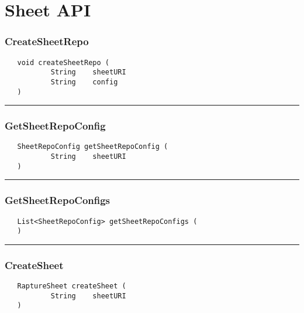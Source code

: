 \chapter{Sheet API}

\subsection{CreateSheetRepo}
\label{Api:CreateSheetRepo}
\begin{verbatim}
   void createSheetRepo (
           String    sheetURI
           String    config
   )
\end{verbatim}



\rule{15cm}{2pt}
\subsection{GetSheetRepoConfig}
\label{Api:GetSheetRepoConfig}
\begin{verbatim}
   SheetRepoConfig getSheetRepoConfig (
           String    sheetURI
   )
\end{verbatim}



\rule{15cm}{2pt}
\subsection{GetSheetRepoConfigs}
\label{Api:GetSheetRepoConfigs}
\begin{verbatim}
   List<SheetRepoConfig> getSheetRepoConfigs (
   )
\end{verbatim}



\rule{15cm}{2pt}
\subsection{CreateSheet}
\label{Api:CreateSheet}
\begin{verbatim}
   RaptureSheet createSheet (
           String    sheetURI
   )
\end{verbatim}



